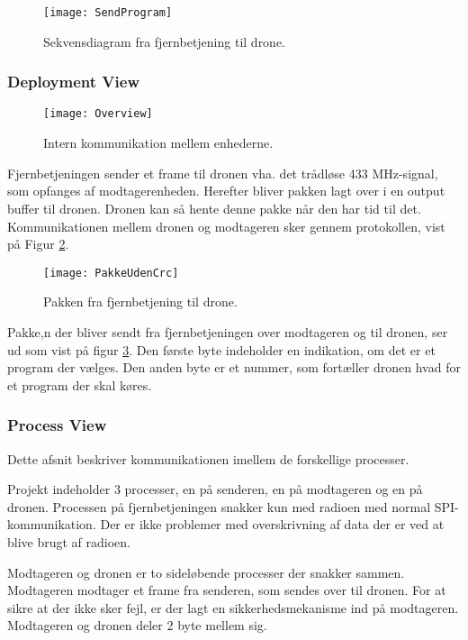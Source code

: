 \documentclass[Main]{subfiles}
\begin{document}
\begin{figure}[H]
\centering
\texttt{[image: SendProgram]}
\caption{Sekvensdiagram fra fjernbetjening til drone.}
\label{Fig:sendProgram}
\end{figure}

\subsubsection*{Deployment View}

\begin{figure}[H]
\centering
\texttt{[image: Overview]}
\caption{Intern kommunikation mellem enhederne.}
\label{Fig:Overview}
\end{figure}

Fjernbetjeningen sender et frame til dronen vha. det trådløse 433 MHz-signal, som opfanges af modtagerenheden.
Herefter bliver pakken lagt over i en output buffer til dronen. Dronen kan så hente denne pakke når den har tid til det. 
Kommunikationen mellem dronen og modtageren sker gennem \itoc protokollen, vist på Figur \ref{Fig:Overview}.


\begin{figure}[H]
\centering
\texttt{[image: PakkeUdenCrc]}
\caption{Pakken fra fjernbetjening til drone.}
\label{Fig:PakkeUdenCrc}
\end{figure}

Pakke,n der bliver sendt fra fjernbetjeningen over modtageren og til dronen, ser ud som vist på figur \ref{Fig:PakkeUdenCrc}.
Den første byte indeholder en indikation, om det er et program der vælges.
Den anden byte er et nummer, som fortæller dronen hvad for et program der skal køres.






\subsubsection*{Process View}
Dette afsnit beskriver kommunikationen imellem de forskellige processer.

Projekt indeholder 3 processer, en på senderen, en på modtageren og en på dronen.
Processen på fjernbetjeningen snakker kun med radioen med normal SPI-kommunikation. 
Der er ikke problemer med overskrivning af data der er ved at blive brugt af radioen.

Modtageren og dronen er to sideløbende processer der snakker sammen.
Modtageren modtager et frame fra senderen, som sendes over \itoc til dronen.
For at sikre at der ikke sker fejl, er der lagt en sikkerhedsmekanisme ind på modtageren. 
Modtageren og dronen deler 2 byte mellem sig.
\end{document}
